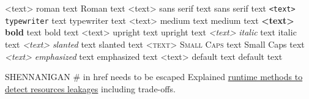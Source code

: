 

\textrm{<text>}       \textrm{roman} text         Roman text
\textsf{<text>}       \textsf{sans serif} text    sans serif text
\texttt{<text>}       \texttt{typewriter} text    typewriter text
\textmd{<text>}       \textmd{medium} text        medium text
\textbf{<text>}       \textbf{bold} text          bold text
\textup{<text>}       \textup{upright} text       upright text
\textit{<text>}       \textit{italic} text        italic text
\textsl{<text>}       \textsl{slanted} text       slanted text
\textsc{<text>}       \textsc{Small Caps} text    Small Caps text
\emph{<text>}         \emph{emphasized} text      emphasized text
\textnormal{<text>}   \textnormal{default} text   default text

SHENNANIGAN
# in href needs to be escaped
Explained \href{https://github.com/ziglang/zig/issues/6152\#issuecomment-1369286411}{\color{darkblue}runtime methods to detect resources leakages} including trade-offs.
